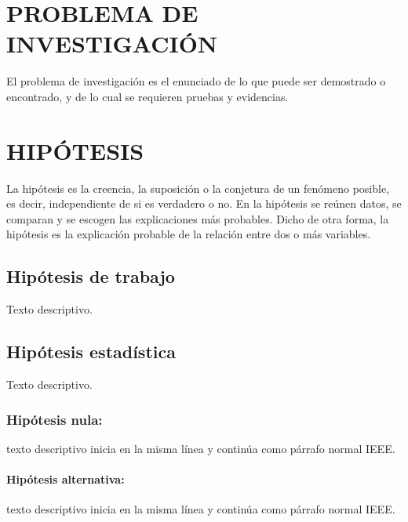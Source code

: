 \section{PROBLEMA DE INVESTIGACIÓN}


El problema de investigación es el enunciado de lo que puede ser demostrado o encontrado, y de lo cual se requieren pruebas y evidencias.


\newpage


\section{HIPÓTESIS}


La hipótesis es la creencia, la suposición o la conjetura de un fenómeno posible, es decir, independiente de si es verdadero o no. En la hipótesis se reúnen datos, se comparan y se escogen las explicaciones más probables. Dicho de otra forma, la hipótesis es la explicación probable de la relación entre dos o más variables.

\subsection{Hipótesis de trabajo}
Texto descriptivo.

\subsection{Hipótesis estadística}
Texto descriptivo.
    
\subsubsection{Hipótesis nula:}
texto descriptivo inicia en la misma línea y continúa como párrafo normal IEEE.

\paragraph{Hipótesis alternativa:}
texto descriptivo inicia en la misma línea y continúa como párrafo normal IEEE.